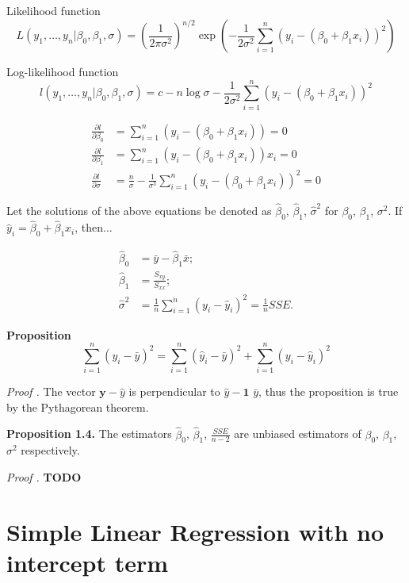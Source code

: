\documentclass[12pt,a4paper,oneside]{book} %
\begin{document}
Likelihood function
\[
L(y_1, \ldots, y_n | \beta_0, \beta_1, \sigma) = \left( \frac{1}{2\pi\sigma^2} \right)^{n/2} \exp\left( -\frac{1}{2\sigma^2} \sum_{i=1}^{n} (y_i - (\beta_0 + \beta_1 x_i))^2 \right)
\]

Log-likelihood function
\[
l(y_1, \ldots, y_n | \beta_0, \beta_1, \sigma) = c - n \log \sigma - \frac{1}{2\sigma^2} \sum_{i=1}^{n} (y_i - (\beta_0 + \beta_1 x_i))^2
\]


\begin{align*}
\frac{\partial l}{\partial \beta_0} &= \sum_{i=1}^{n} (y_i - (\beta_0 + \beta_1 x_i)) = 0 \\
\frac{\partial l}{\partial \beta_1} &= \sum_{i=1}^{n} (y_i - (\beta_0 + \beta_1 x_i))x_i = 0  \\
\frac{\partial l}{\partial \sigma} &= \frac{n}{\sigma} - \frac{1}{\sigma^3} \sum_{i=1}^{n} (y_i - (\beta_0 + \beta_1 x_i))^2 = 0 
\end{align*}

Let the solutions of the above equations be denoted as $\hat{\beta}_0$, $\hat{\beta}_1$, $\hat{\sigma}^2$ for $\beta_0$, $\beta_1$, $\sigma^2$. If $\hat{y}_i = \hat{\beta}_0 + \hat{\beta}_1 x_i$, then...

\begin{align*}
\hat{\beta}_0  &= \bar{y} - \hat{\beta}_1 \bar{x}; \\
\hat{\beta}_1 &= \frac{S_{xy}}{S_{xx}}; \\
\hat{\sigma}^2 &= \frac{1}{n} \sum_{i=1}^{n} (y_i - \hat{y}_i)^2 = \frac{1}{n} SSE.
\end{align*}


\textbf{Proposition}
\[
\sum_{i=1}^{n} (y_i - \bar{y})^2 = \sum_{i=1}^{n} (\hat{y}_i - \bar{y})^2 + \sum_{i=1}^{n} (y_i - \hat{y}_i)^2
\]

\textit{Proof .} The vector $\textbf{y} - \textbf{$\hat{y}$}$ is perpendicular to $\textbf{$\hat{y}$} - \textbf{1 $\bar{y}$}$, thus the proposition is true by the Pythagorean theorem.


\textbf{Proposition 1.4.} The estimators $\hat{\beta}_0$, $\hat{\beta}_1$, $\frac{SSE}{n-2}$ are unbiased estimators of $\beta_0$, $\beta_1$, $\sigma^2$ respectively.

\textit{Proof .} \textbf{TODO}



	\clearpage

	\section{Simple Linear Regression with no intercept term}
	
\end{document}
